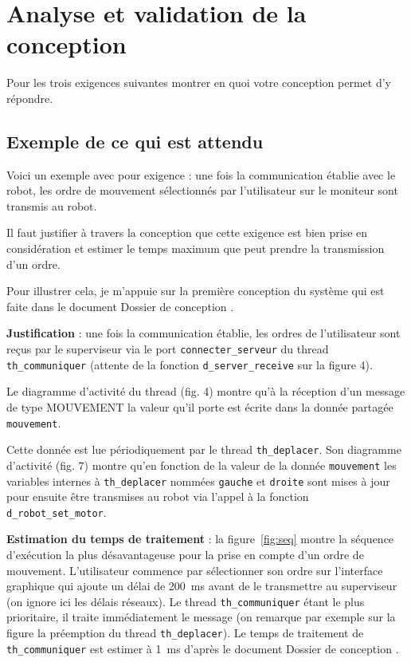 \documentclass[11pt, a4paper]{paper}
\begin{document}
\newpage

\section{Analyse et validation de la conception}

{\color{red}
Pour les trois exigences suivantes montrer en quoi votre conception permet d’y répondre. }

{\color{red} \subsection*{Exemple de ce qui est attendu}

Voici un exemple avec pour exigence : \og une fois la communication établie avec le robot, les ordre de mouvement sélectionnés par l'utilisateur sur le moniteur sont transmis au robot.\fg\ 

Il faut justifier à travers la conception que cette exigence est bien prise en considération et estimer le temps maximum que peut prendre la transmission d'un ordre.

Pour illustrer cela, je m'appuie sur la première conception du système qui est faite  dans le document \og Dossier de conception \fg.

{\bf Justification} : une fois la communication établie, les ordres de l'utilisateur sont reçus par le superviseur via le port {\tt connecter\_serveur} du thread {\tt th\_communiquer} (attente de la fonction {\tt d\_server\_receive} sur la figure 4).

Le diagramme d'activité du thread (fig. 4) montre qu'à la réception d'un message de type MOUVEMENT la valeur qu'il porte est écrite dans la donnée partagée {\tt mouvement}. 

Cette donnée est lue périodiquement par le thread {\tt th\_deplacer}. Son diagramme d'activité (fig. 7) montre qu'en fonction de la valeur de la donnée {\tt mouvement} les variables  internes à {\tt th\_deplacer} nommées {\tt gauche} et {\tt droite} sont mises à jour pour ensuite être transmises au robot via l'appel à la fonction {\tt d\_robot\_set\_motor}.

{\bf Estimation du temps de traitement} : la figure~\ref{fig:seq} montre la séquence d'exécution la plus désavantageuse pour la prise en compte d'un ordre de mouvement. L'utilisateur commence par sélectionner son ordre sur l'interface graphique qui ajoute un délai de 200~ms avant de le transmettre au superviseur (on ignore ici les délais réseaux). Le thread {\tt th\_communiquer} étant le plus prioritaire, il traite immédiatement le message (on remarque par exemple sur la figure la préemption du thread {\tt th\_deplacer}). Le temps de traitement de {\tt th\_communiquer} est estimer à 1~ms d'après le document \og Dossier de conception \fg.

}
\end{document}
